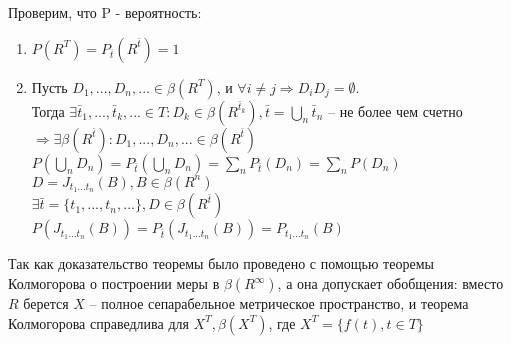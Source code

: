 Проверим, что P - вероятность:
\begin{enumerate}
\item $P(R^{T}) = P_{\bar{t}}(R^{\bar{t}}) = 1$
\item Пусть $D_{1},..., D_{n},... \in \beta(R^{T})$, и $\forall i\ne j \Rightarrow D_{i}D_{j} = \emptyset$.\\
Тогда $\exists \bar{t}_1,..., \bar{t}_k,... \in T: D_{k} \in \beta(R^{\bar{t}_k}), \bar{t} = \bigcup\limits_{n} \bar{t}_n$ -- не более чем счетно $\Rightarrow \exists \beta(R^{\bar{t}}): D_{1},..., D_{n},... \in \beta(R^{\bar{t}})$\\
$P\left(\bigcup\limits_{n}D_{n}\right) = P_{\bar{t}}\left(\bigcup\limits_{n}D_{n}\right) = \sum\limits_{n}P_{\bar{t}}(D_{n}) = \sum\limits_{n}P(D_{n})$\\
$D = J_{t_{1}...t_{n}}(B), B \in \beta(R^{n})$\\
$\exists \bar{t} = \{t_{1},..., t_{n},...\}, D \in \beta(R^{\bar{t}})$\\
$P(J_{t_{1}...t_{n}}(B)) = P_{\bar{t}}(J_{t_1...t_n}(B)) = P_{t_1 ... t_n}(B)$
\end{enumerate}
\begin{remark}
Так как доказательство теоремы было проведено с помощью теоремы Колмогорова о построении меры в $\beta(R^{\infty})$, а она допускает обобщения: вместо $R$ берется $X$ -- полное сепарабельное метрическое пространство, и теорема Колмогорова справедлива для $X^{T}, \beta(X^{T})$, где $X^{T} = \{f(t), t\in T\}$
\end{remark}
